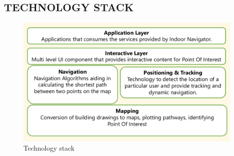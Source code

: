 \documentclass[a4paper, 12pt]{article}
\begin{document}
\subsection{TECHNOLOGY STACK}
\begin{figure}[h!]
    \centering
    \includegraphics[width = 6in]{1.png}
    \caption{Technology stack}
    \label{fig: blockbit}
\end{figure}
\end{document}
